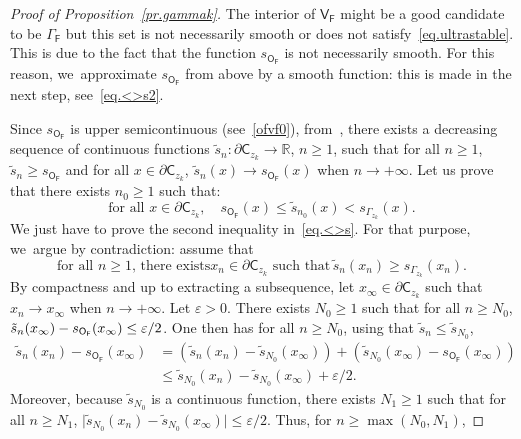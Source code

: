 \documentclass[JEP,XML,SOM,Unicode,NoEqCountersInSection,NoFloatCountersInSection,published]{cedram}
\let\pa\partial
\let\ve\varepsilon
\theoremstyle{plain}
\theoremstyle{definition}
\begin{document}
\begin{proof}[Proof of Proposition~\ref{pr.gammak}]
The interior of $\mathsf V_{\mathsf F}$ might be a good candidate to be $\Gamma_{\mathsf F}$ but this set is not necessarily smooth or does not satisfy~\eqref{eq.ultrastable}. This is due to the fact that the function $s_{\mathsf O_{\mathsf F}}$ is not necessarily smooth. For this reason, we~approximate $s_{\mathsf O_{\mathsf F}}$ from above by a smooth function: this is made in
the next step, see~\eqref{eq.<>s2}.


Since $s_{\mathsf O_{\mathsf F}}$ is upper semicontinuous (see~\eqref{ofvf0}), from~\cite[Th.\,3]{tong1952some}, there exists a decreasing sequence of continuous functions $\tilde s_n:\pa \mathsf C_{z_k} \to \mathbb R$, $n\ge 1$, such that for all $n\ge 1$, $\tilde s_n\ge s_{\mathsf O_{\mathsf F}}$ and for all $x\in \pa \mathsf C_{z_k}$, $\tilde s_n(x)\to s_{\mathsf O_{\mathsf F}}(x)$ when $n\to +\infty$.
Let us prove that there exists $n_0\ge 1$ such that:
\begin{equation}\label{eq.<>s}
\text{for all } x\in \pa \mathsf C_{z_k}, \quad s_{\mathsf O_{\mathsf F}}(x)\le \tilde s_{n_0}(x)< s_{\Gamma_{z_k}}(x).
\end{equation}
We just have to prove the second inequality in~\eqref{eq.<>s}. For that purpose, we~argue by contradiction: assume that
\begin{equation}\label{geabs}
\text{for all $n\ge 1$, there exists
$x_n\in \pa \mathsf C_{z_k}$ such that}\, \tilde s_{n}(x_n)\ge s_{\Gamma_{z_k}}(x_n).
\end{equation}
By compactness and up to extracting a subsequence, let $x_{\infty}\!\in\! \pa { \mathsf C_{z_k}}$ such that \hbox{$x_n\!\to\! x_{\infty}$} when $n\to +\infty$. Let $\ve >0$. There exists $N_0\ge 1$ such that for all $n\ge N_0$, $\tilde s_{n}(x_{\infty})-\nobreak s_{\mathsf O_{\mathsf F}}(x_{\infty}) \le \ve/2$.
One then has for all $n\ge N_0$, using that $\tilde s_{n}\le \tilde s_{N_0}$,
\begin{align*}
\tilde s_{n}(x_n)- s_{\mathsf O_{\mathsf F}}(x_{\infty})&=(\tilde
s_{n}(x_n)-\tilde
s_{N_0}(x_{\infty}))+(\tilde
s_{N_0}(x_{\infty})-
s_{\mathsf
O_{\mathsf
F}}(x_{\infty}))\\
&\le \tilde s_{N_0}(x_n)-\tilde s_{N_0}(x_{\infty}) + \ve/2.
\end{align*}
Moreover, because $\tilde s_{N_0}$ is a continuous function, there exists $N_1\!\ge\! 1$ such that for all $n\ge N_1$, $\vert \tilde s_{N_0}(x_n)-\tilde s_{N_0}(x_{\infty})\vert \!\le\! \ve/2$. Thus, for $n\!\ge\! \max(N_0,N_1)$,

\end{proof}
\end{document}
